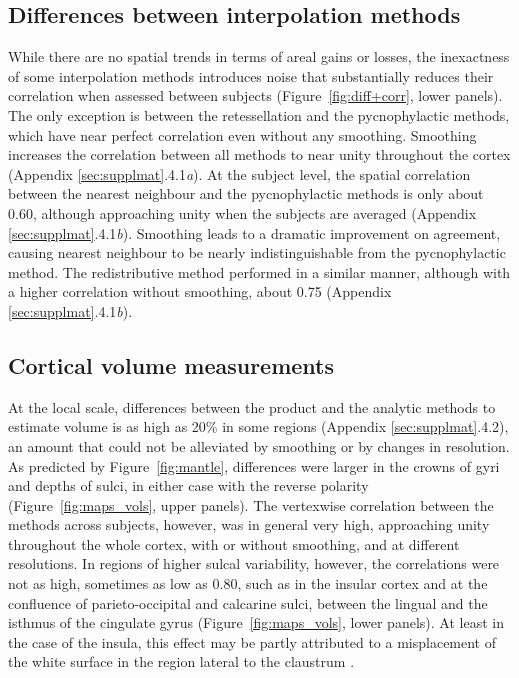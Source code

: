 \subsection{Differences between interpolation methods}

While there are no spatial trends in terms of areal gains or losses, the inexactness of some interpolation methods introduces noise that substantially reduces their correlation when assessed between subjects (Figure~\ref{fig:diff+corr}, lower panels). The only exception is between the retessellation and the pycnophylactic methods, which have near perfect correlation even without any smoothing. Smoothing increases the correlation between all methods to near unity throughout the cortex (Appendix \ref{sec:supplmat}.4.1\emph{a}). At the subject level, the spatial correlation between the nearest neighbour and the pycnophylactic methods is only about 0.60, although approaching unity when the subjects are averaged (Appendix \ref{sec:supplmat}.4.1\emph{b}). Smoothing leads to a dramatic improvement on agreement, causing nearest neighbour to be nearly indistinguishable from the pycnophylactic method. The redistributive method performed in a similar manner, although with a higher correlation without smoothing, about 0.75 (Appendix \ref{sec:supplmat}.4.1\emph{b}).

\subsection{Cortical volume measurements}

At the local scale, differences between the product and the analytic methods to estimate volume is as high as 20\% in some regions (Appendix \ref{sec:supplmat}.4.2), an amount that could not be alleviated by smoothing or by changes in resolution. As predicted by Figure~\ref{fig:mantle}, differences were larger in the crowns of gyri and depths of sulci, in either case with the reverse polarity (Figure~\ref{fig:maps_vols}, upper panels). The vertexwise correlation between the methods across subjects, however, was in general very high, approaching unity throughout the whole cortex, with or without smoothing, and at different resolutions. In regions of higher sulcal variability, however, the correlations were not as high, sometimes as low as 0.80, such as in the insular cortex and at the confluence of parieto-occipital and calcarine sulci, between the lingual and the isthmus of the cingulate gyrus (Figure~\ref{fig:maps_vols}, lower panels). At least in the case of the insula, this effect may be partly attributed to a misplacement of the white surface in the region lateral to the claustrum \citep{Glasser2016}.

